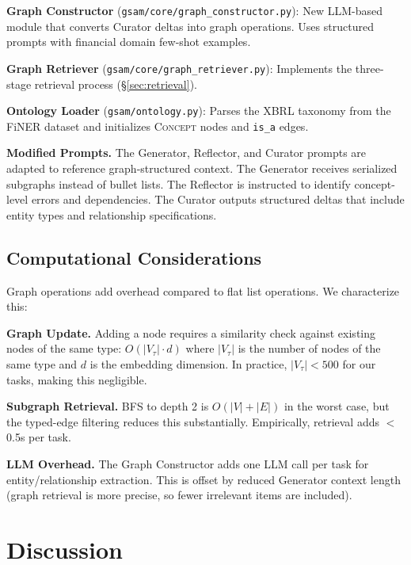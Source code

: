 \documentclass[12pt,a4paper]{article}
\begin{document}
\textbf{Graph Constructor} (\texttt{gsam/core/graph\_constructor.py}): New LLM-based module that converts Curator deltas into graph operations. Uses structured prompts with financial domain few-shot examples.

\textbf{Graph Retriever} (\texttt{gsam/core/graph\_retriever.py}): Implements the three-stage retrieval process (\S\ref{sec:retrieval}).

\textbf{Ontology Loader} (\texttt{gsam/ontology.py}): Parses the XBRL taxonomy from the FiNER dataset and initializes \textsc{Concept} nodes and \texttt{is\_a} edges.

\textbf{Modified Prompts.} The Generator, Reflector, and Curator prompts are adapted to reference graph-structured context. The Generator receives serialized subgraphs instead of bullet lists. The Reflector is instructed to identify concept-level errors and dependencies. The Curator outputs structured deltas that include entity types and relationship specifications.

\subsection{Computational Considerations}

Graph operations add overhead compared to flat list operations. We characterize this:

\textbf{Graph Update.} Adding a node requires a similarity check against existing nodes of the same type: $O(|V_\tau| \cdot d)$ where $|V_\tau|$ is the number of nodes of the same type and $d$ is the embedding dimension. In practice, $|V_\tau| < 500$ for our tasks, making this negligible.

\textbf{Subgraph Retrieval.} BFS to depth 2 is $O(|V| + |E|)$ in the worst case, but the typed-edge filtering reduces this substantially. Empirically, retrieval adds $<$0.5s per task.

\textbf{LLM Overhead.} The Graph Constructor adds one LLM call per task for entity/relationship extraction. This is offset by reduced Generator context length (graph retrieval is more precise, so fewer irrelevant items are included).


\section{Discussion}
\label{sec:discussion}
\end{document}
